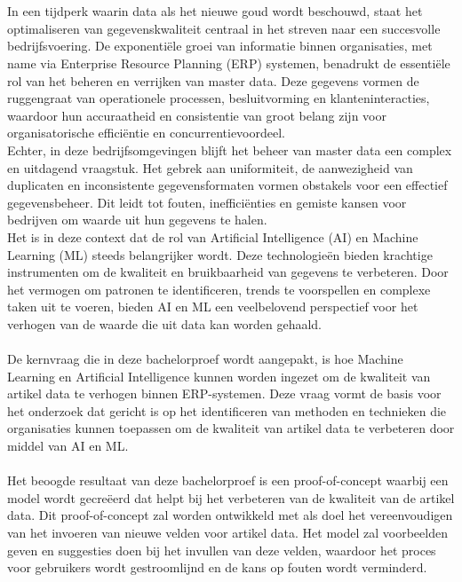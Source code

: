 
\chapter{}%
\label{ch:inleiding}

In een tijdperk waarin data als het nieuwe goud wordt beschouwd, staat het optimaliseren van gegevenskwaliteit centraal in het streven naar een succesvolle bedrijfsvoering. De exponentiële groei van informatie binnen organisaties, met name via Enterprise Resource Planning (ERP) systemen, benadrukt de essentiële rol van het beheren en verrijken van master data. Deze gegevens vormen de ruggengraat van operationele processen, besluitvorming en klanteninteracties, waardoor hun accuraatheid en consistentie van groot belang zijn voor organisatorische efficiëntie en concurrentievoordeel.
\\
Echter, in deze bedrijfsomgevingen blijft het beheer van master data een complex en uitdagend vraagstuk. Het gebrek aan uniformiteit, de aanwezigheid van duplicaten en inconsistente gegevensformaten vormen obstakels voor een effectief gegevensbeheer. Dit leidt tot fouten, inefficiënties en gemiste kansen voor bedrijven om waarde uit hun gegevens te halen.
\\
Het is in deze context dat de rol van Artificial Intelligence (AI) en Machine Learning (ML) steeds belangrijker wordt. Deze technologieën bieden krachtige instrumenten om de kwaliteit en bruikbaarheid van gegevens te verbeteren. Door het vermogen om patronen te identificeren, trends te voorspellen en complexe taken uit te voeren, bieden AI en ML een veelbelovend perspectief voor het verhogen van de waarde die uit data kan worden gehaald.
\\ \\
De kernvraag die in deze bachelorproef wordt aangepakt, is hoe Machine Learning en Artificial Intelligence kunnen worden ingezet om de kwaliteit van artikel data te verhogen binnen ERP-systemen. Deze vraag vormt de basis voor het onderzoek dat gericht is op het identificeren van methoden en technieken die organisaties kunnen toepassen om de kwaliteit van artikel data te verbeteren door middel van AI en ML.
\\ \\
Het beoogde resultaat van deze bachelorproef is een proof-of-concept waarbij een model wordt gecreëerd dat helpt bij het verbeteren van de kwaliteit van de artikel data. Dit proof-of-concept zal worden ontwikkeld met als doel het vereenvoudigen van het invoeren van nieuwe velden voor artikel data. Het model zal voorbeelden geven en suggesties doen bij het invullen van deze velden, waardoor het proces voor gebruikers wordt gestroomlijnd en de kans op fouten wordt verminderd.
